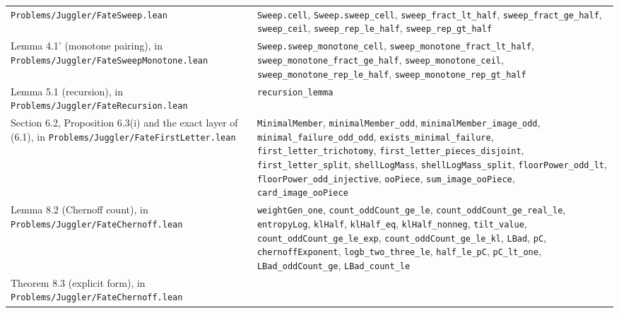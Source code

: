 \documentclass[11pt,a4paper]{article}
\begin{document}
\begin{longtable}[]{@{}
  >{\raggedright\arraybackslash}p{}
  >{\raggedright\arraybackslash}p{}@{}}
\texttt{\nolinkurl{Problems/Juggler/FateSweep.lean}} &
\texttt{\nolinkurl{Sweep.cell}}, \texttt{\nolinkurl{Sweep.sweep_cell}},
\texttt{\nolinkurl{sweep_fract_lt_half}},
\texttt{\nolinkurl{sweep_fract_ge_half}},
\texttt{\nolinkurl{sweep_ceil}}, \texttt{\nolinkurl{sweep_rep_le_half}},
\texttt{\nolinkurl{sweep_rep_gt_half}} \\
Lemma 4.1' (monotone pairing), in
\texttt{\nolinkurl{Problems/Juggler/FateSweepMonotone.lean}} &
\texttt{\nolinkurl{Sweep.sweep_monotone_cell}},
\texttt{\nolinkurl{sweep_monotone_fract_lt_half}},
\texttt{\nolinkurl{sweep_monotone_fract_ge_half}},
\texttt{\nolinkurl{sweep_monotone_ceil}},
\texttt{\nolinkurl{sweep_monotone_rep_le_half}},
\texttt{\nolinkurl{sweep_monotone_rep_gt_half}} \\
Lemma 5.1 (recursion), in
\texttt{\nolinkurl{Problems/Juggler/FateRecursion.lean}} &
\texttt{\nolinkurl{recursion_lemma}} \\
Section 6.2, Proposition 6.3(i) and the exact layer of (6.1), in
\texttt{\nolinkurl{Problems/Juggler/FateFirstLetter.lean}} &
\texttt{\nolinkurl{MinimalMember}},
\texttt{\nolinkurl{minimalMember_odd}},
\texttt{\nolinkurl{minimalMember_image_odd}},
\texttt{\nolinkurl{minimal_failure_odd_odd}},
\texttt{\nolinkurl{exists_minimal_failure}},
\texttt{\nolinkurl{first_letter_trichotomy}},
\texttt{\nolinkurl{first_letter_pieces_disjoint}},
\texttt{\nolinkurl{first_letter_split}},
\texttt{\nolinkurl{shellLogMass}},
\texttt{\nolinkurl{shellLogMass_split}},
\texttt{\nolinkurl{floorPower_odd_lt}},
\texttt{\nolinkurl{floorPower_odd_injective}},
\texttt{\nolinkurl{ooPiece}}, \texttt{\nolinkurl{sum_image_ooPiece}},
\texttt{\nolinkurl{card_image_ooPiece}} \\
Lemma 8.2 (Chernoff count), in
\texttt{\nolinkurl{Problems/Juggler/FateChernoff.lean}} &
\texttt{\nolinkurl{weightGen_one}},
\texttt{\nolinkurl{count_oddCount_ge_le}},
\texttt{\nolinkurl{count_oddCount_ge_real_le}},
\texttt{\nolinkurl{entropyLog}}, \texttt{\nolinkurl{klHalf}},
\texttt{\nolinkurl{klHalf_eq}}, \texttt{\nolinkurl{klHalf_nonneg}},
\texttt{\nolinkurl{tilt_value}},
\texttt{\nolinkurl{count_oddCount_ge_le_exp}},
\texttt{\nolinkurl{count_oddCount_ge_le_kl}}, \texttt{\nolinkurl{LBad}},
\texttt{\nolinkurl{pC}}, \texttt{\nolinkurl{chernoffExponent}},
\texttt{\nolinkurl{logb_two_three_le}}, \texttt{\nolinkurl{half_le_pC}},
\texttt{\nolinkurl{pC_lt_one}}, \texttt{\nolinkurl{LBad_oddCount_ge}},
\texttt{\nolinkurl{LBad_count_le}} \\
Theorem 8.3 (explicit form), in
\texttt{\nolinkurl{Problems/Juggler/FateChernoff.lean}} &

\end{longtable}
\end{document}
